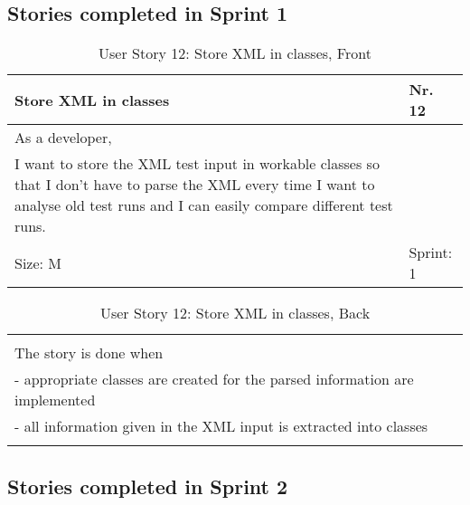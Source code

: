
\subsection*{Stories completed in Sprint 1}

\begin{table}[h]
  \caption{User Story 12: Store XML in classes, Front}
  \label{Story_12_Front}
  \centering
  \begin{tabular}{|p{9cm} p{2cm}|}
	\hline  	
  	Store XML in classes & Nr. 12 \\ 
  	\hline
  	As a developer, &    \\ 
  	I want to store the XML test input in workable classes so that I don't have to parse the XML every time I want to analyse old test runs and I can easily compare different test runs. &    \\ 
  	Size: M & Sprint: 1 \\ 
  	\hline
  \end{tabular}
\end{table}
\begin{table}[h]
  \caption{User Story 12: Store XML in classes, Back}
  \label{Story_12_Back}
  \centering
  \begin{tabular}{|p{10cm} p{1cm}|}
  \hline
  	  &    \\ 
  	The story is done when &    \\ 
  	 - appropriate classes are created for the parsed information are implemented & \\
  	 - all information given in the XML input is extracted into classes &    \\ 
  	 
  	  &  
  	   \\ 
  	\hline
  \end{tabular}
\end{table}

\subsection*{Stories completed in Sprint 2}

